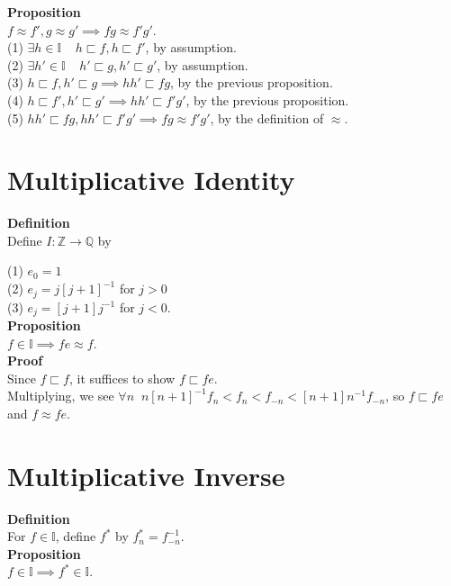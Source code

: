 \documentclass{article}
\newcommand{\rat}{ \mathbb{Q}}
\newcommand{\zee}{ \mathbb{Z}}
\newcommand{\zeqs}{ \mathbb{I}}
\newcommand{\forks}{ \sqsubset}
\begin{document}
\textbf{Proposition}\\
$f \approx f', g \approx g' \implies fg \approx f'g'$.\\

(1) $\exists h \in \zeqs \;\;\;\; h \forks f, h \forks f'$, by assumption.\\
(2) $\exists h' \in \zeqs \;\;\;\; h' \forks g, h' \forks g'$, by assumption.\\
(3) $h \forks f, h' \forks g \implies hh' \forks fg$, by the previous proposition.\\
(4) $h \forks f', h' \forks g' \implies hh' \forks f'g'$, by the previous proposition.\\
(5) $hh' \forks fg,hh' \forks f'g' \implies fg \approx f'g'$, by the definition of $\approx$.\\

\section{Multiplicative Identity}

\textbf{Definition}\\
Define $I : \zee \to \rat$ by 

(1) $e_0 = 1$\\
(2) $e_j = j[j+1]^{-1}$ for $j > 0$\\
(3) $e_j = [j+1]j^{-1}$ for $j < 0$.\\

\textbf{Proposition}\\
$f \in \zeqs \implies fe \approx f$.\\

\textbf{Proof}\\
Since $f \forks f$, it suffices to show $f \forks fe$.\\

Multiplying, we see $\forall n \;\; n[n+1]^{-1}f_n < f_n < f_{-n} < [n+1]n^{-1}f_{-n}$, so $f \forks fe$ and $f \approx fe.$\\


\section{Multiplicative Inverse}


\textbf{Definition}\\
For $f \in \zeqs$, define $f^*$ by $f^*_{n} =  f^{-1}_{-n}$.\\

\textbf{Proposition}\\
$f \in \zeqs \implies f^* \in \zeqs$.\\
\end{document}
